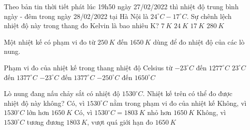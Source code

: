 \begin{vidu}
	Theo bản tin thời tiết phát lúc 19h50 ngày 27/02/2022 thì nhiệt độ trung bình ngày - đêm trong ngày 28/02/2022 tại Hà Nội là $24^\circ C-17^\circ C$. Sự chênh lệch nhiệt độ này trong thang đo Kelvin là bao nhiêu K?
	\choice
	{\True $7\ K$}
	{$24\ K$}
	{$17\ K$}
	{$280\ K$}
	\end{vidu}
\begin{vidu} 
	Một nhiệt kế có phạm vi đo từ $250\ K$ đến $1650\ K$ dùng để đo nhiệt độ của các lò nung.
	\begin{vdc}
		Phạm vi đo của nhiệt kế trong thang nhiệt độ Celsius từ
		\choice
		{$-23^\circ C$ đến $1277^\circ C$}
		{$23^\circ C$ đến $1377^\circ C$}
		{\True $-23^\circ C$ đến $1377^\circ C$}
		{$-250^\circ C$ đến $1650^\circ C$}
		
	\end{vdc}
	\dotlineEX{4}
	\begin{vdc}
		Lò nung đang nấu chảy sắt có nhiệt độ $1530^\circ C$. Nhiệt kế trên có thể đo được nhiệt độ này không?
		\choice
		{Có, vì $1530^\circ C$ nằm trong phạm vi đo của nhiệt kế}
		{Không, vì $1530^\circ C$ lớn hơn $1650\ K$}
		{Có, vì $1530^\circ C = 1803\ K$ nhỏ hơn $1650\ K$}
		{\True Không, vì $1530^\circ C$ tương đương $1803\ K$, vượt quá giới hạn đo $1650\ K$}

	\end{vdc}
\end{vidu}

